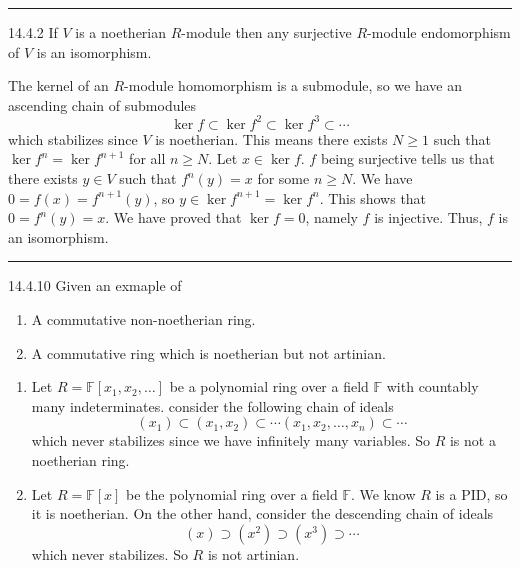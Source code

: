 \documentclass[a4paper, 12pt]{article}
\begin{document}
\noindent\rule{7in}{2.8pt}
\begin{problem}{14.4.2}
If \(V\) is a noetherian \(R\)-module then any surjective \(R\)-module endomorphism of \(V\) is an isomorphism.
\end{problem}
\begin{solution}
The kernel of an \(R\)-module homomorphism is a submodule, so we have an ascending chain of submodules 
\[\ker f\subset \ker f^2\subset \ker f^3\subset \cdots\]
which stabilizes since \(V\) is noetherian. This means there exists \(N\geq 1\) such that \(\ker f^n=\ker f^{n+1} \) for all \(n\geq N\). Let \(x\in \ker f\). \(f\) being surjective tells us that 
there exists \(y\in V\) such that \(f^n(y)=x\) for some \(n\geq N\). We have \(0=f(x)=f^{n+1}(y)\), so \(y\in \ker f^{n+1}=\ker f^n\). This shows that \(0=f^n(y)=x\). We have proved that 
\(\ker f=0\), namely \(f\) is injective. Thus, \(f\) is an isomorphism. 
\end{solution}

\noindent\rule{7in}{2.8pt}
\begin{problem}{14.4.10}
Given an exmaple of 
\begin{enumerate}[(1)]
\item A commutative non-noetherian ring.
\item A commutative ring which is noetherian but not artinian.
\end{enumerate}
\end{problem}
\begin{solution}
\begin{enumerate}[(1)]
\item Let \(R=\mathbb{F}[x_1,x_2,\ldots]\) be a polynomial ring over a field \(\mathbb{F}\) with countably many indeterminates. consider the following chain of ideals 
\[(x_1)\subset (x_1,x_2)\subset \cdots (x_1,x_2,\ldots,x_n)\subset \cdots\]
which never stabilizes since we have infinitely many variables. So \(R\) is not a noetherian ring.
\item Let \(R=\mathbb{F}[x]\) be the polynomial ring over a field \(\mathbb{F}\). We know \(R\) is a PID, so it is noetherian. On the other hand, consider the descending chain of ideals 
\[(x)\supset (x^2)\supset (x^3)\supset \cdots\]
which never stabilizes. So \(R\) is not artinian.
\end{enumerate}  
\end{solution}
\end{document}
